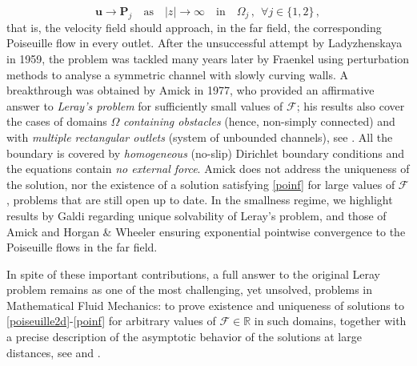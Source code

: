 \documentclass[11pt]{article}
\numberwithin{equation}{section}
\numberwithin{figure}{section}
\def\Fe{{\mathcal F}}
\def\ue{{\mathbf u}}
\begin{document}
\begin{equation} \label{poinf}
\ue \longrightarrow \mathbf{P}_j \quad \text{as} \quad |z| \to \infty \quad \text{in} \quad \Omega_{j} \, , \ \ \forall j \in \{1,2 \} \, ,
\end{equation}
that is, the velocity field should approach, in the far field, the corresponding Poiseuille flow in every outlet. After the unsuccessful
attempt by Ladyzhenskaya \cite{ladyzhenskaya1959stationary} in 1959, the problem was tackled many years later by Fraenkel
\cite{fraenkel1973theory,fraenkel1975theory} using perturbation methods to analyse a symmetric channel with slowly curving walls.
A breakthrough was obtained by Amick \cite[Theorem 3.8]{amick1977steady} in 1977, who provided an affirmative answer to \textit{Leray's problem}
for sufficiently small values of $\Fe$; his results also cover the cases of domains $\Omega$ {\it containing obstacles} (hence, non-simply
connected) and with {\it multiple rectangular outlets} (system of unbounded channels), see \cite[Remarks (b)-(c), p.498]{amick1977steady}.
All the boundary is covered by {\it homogeneous} (no-slip) Dirichlet boundary conditions and the equations contain {\it no external force}.
Amick does not address the uniqueness of the solution, nor the existence of a solution satisfying \eqref{poinf} for large values of $\Fe$,
problems that are still open up to date. In the smallness regime, we highlight results by Galdi \cite[Section XIII.2]{galdi2011introduction}
regarding unique solvability of Leray's problem, and those of Amick \cite{amick1978properties} and Horgan \& Wheeler \cite{horgan1978spatial}
ensuring exponential pointwise convergence to the Poiseuille flows in the far field.\par
In spite of these important contributions, a full answer to the original
Leray problem remains as one of the most challenging, yet unsolved, problems in Mathematical Fluid Mechanics: to prove existence and
uniqueness of solutions to \eqref{poiseuille2d}-\eqref{poinf} for arbitrary values of $\Fe \in \mathbb{R}$ in such domains, together with a precise description of the asymptotic behavior of the solutions at large distances, see \cite[Chapter XIII]{galdi2011introduction} and \cite{pileckas2007navier}.\par
\end{document}
